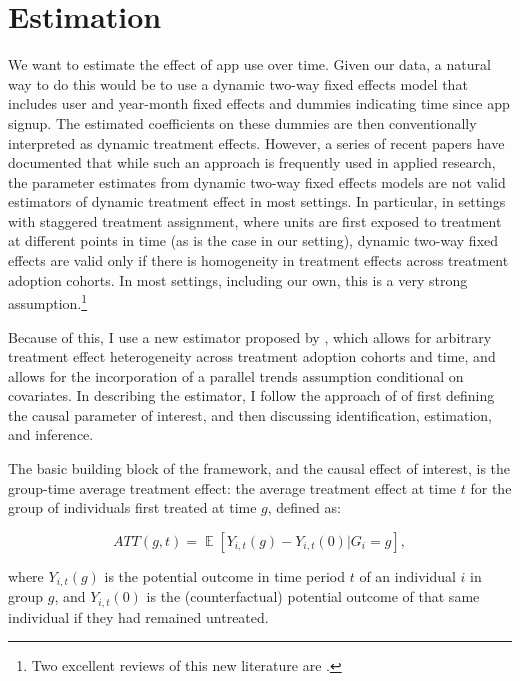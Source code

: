 
\section{Estimation}%
\label{sec:estimation}

We want to estimate the effect of app use over time.  Given our data, a natural
way to do this would be to use a dynamic two-way fixed effects model that
includes user and year-month fixed effects and dummies indicating time since
app signup. The estimated coefficients on these dummies are then conventionally
interpreted as dynamic treatment effects. However, a series of recent papers
have documented that while such an approach is frequently used in applied
research, the parameter estimates from dynamic two-way fixed effects models are
not valid estimators of dynamic treatment effect in most settings. In
particular, in settings with staggered treatment assignment, where units are
first exposed to treatment at different points in time (as is the case in our
setting), dynamic two-way fixed effects are valid only if there is homogeneity
in treatment effects across treatment adoption cohorts. In most settings,
including our own, this is a very strong assumption.\footnote{Two excellent
reviews of this new literature are \citet{roth2022trending, baker2022much}.}

Because of this, I use a new estimator proposed by
\citet{callaway2021difference}, which allows for arbitrary treatment effect
heterogeneity across treatment adoption cohorts and time, and allows for the
incorporation of a parallel trends assumption conditional on covariates. In
describing the estimator, I follow the approach of
\citet{callaway2021difference} of first defining the causal parameter of
interest, and then discussing identification, estimation, and inference.

The basic building block of the framework, and the causal effect of interest,
is the group-time average treatment effect: the average treatment effect at
time $t$ for the group of individuals first treated at time $g$, defined as:

\begin{equation}
    ATT(g,t) = \mathop{\mathbb{E}}[Y_{i,t}(g) - Y_{i,t}(0)|G_i =
    g],
\end{equation}

where $Y_{i,t}(g)$ is the potential outcome in time period $t$ of an individual
$i$ in group $g$, and $Y_{i,t}(0)$ is the (counterfactual) potential outcome of that same
individual if they had remained untreated.

